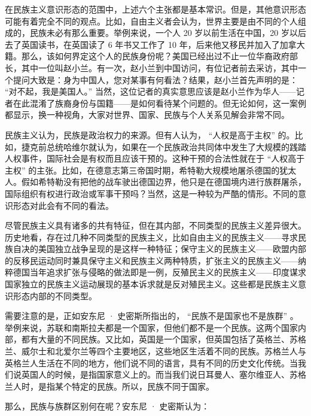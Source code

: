在民族主义意识形态的范围中，上述六个主张都是基本常识。但是，其他意识形态可能有着完全不同的观点。比如，自由主义者会认为，世界主要是由不同的个人组成的，民族未必有那么重要。举例来说，一个人 20 岁以前生活在中国，20 岁以后去了英国读书，在英国读了 6 年书又工作了 10 年，后来他又移民并加入了加拿大籍。那么，该如何界定这个人的民族身份呢？美国已经出过不止一位华裔政府部长，其中一位叫赵小兰。有一次，赵小兰到中国访问，有位记者前去采访，其中一个提问大致是：身为中国人，您对某事有何看法？结果，赵小兰首先声明的是： “对不起，我是美国人。” 当然，这位记者的真实意思应该是赵小兰作为华人——记者在此混淆了族裔身份与国籍——是如何看待某个问题的。但无论如何，这一案例都显示，换一种视角，大家对世界、国家、民族与个人关系见解会非常不同。

民族主义认为，民族是政治权力的来源。但有人认为， “人权是高于主权” 的。比如，捷克前总统哈维尔就认为，如果在一个民族政治共同体中发生了大规模的践踏人权事件，国际社会是有权而且应该干预的。这种干预的合法性就在于 “人权高于主权” 的主张。比如，在德意志第三帝国时期，希特勒大规模地屠杀德国的犹太人。假如希特勒没有把他的战车驶出德国边界，他只是在德国境内进行族群屠杀，国际组织有权进行政治或军事干预吗？当然，这是一种较为严酷的情形。不同的意识形态对此会有不同的看法。

尽管民族主义具有诸多的共有特征，但在其内部，不同类型的民族主义差异很大。历史地看，存在过几种不同类型的民族主义，比如自由主义的民族主义——寻求民族自决的美国独立战争呈现的是这样一种特征；保守主义的民族主义——欧盟内部的反移民运动同时兼具保守主义和民族主义两种特质，扩张主义的民族主义——纳粹德国当年追求扩张与侵略的做法即是一例，反殖民主义的民族主义——印度谋求国家独立的民族主义运动展现的基本诉求就是反对殖民主义。这些都是民族主义意识形态内部的不同类型。

需要注意的是，正如安东尼 · 史密斯所指出的， “民族不是国家也不是族群” 。举例来说，苏联和南斯拉夫都是一个国家，但他们都不是一个民族。这两个国家内部，都有大量的不同民族。又比如，英国是一个国家，但英国包括了英格兰、苏格兰、威尔士和北爱尔兰等四个主要地区，这些地区生活着不同的民族。苏格兰人与英格兰人生活在不同的地方，他们说不同的语言，具有不同的历史文化传统。当我们说英国人的时候，是指国家意义上的。而当我们说日耳曼人、塞尔维亚人、苏格兰人时，是指某个特定的民族。所以，民族不同于国家。

那么，民族与族群区别何在呢？安东尼 · 史密斯认为：


